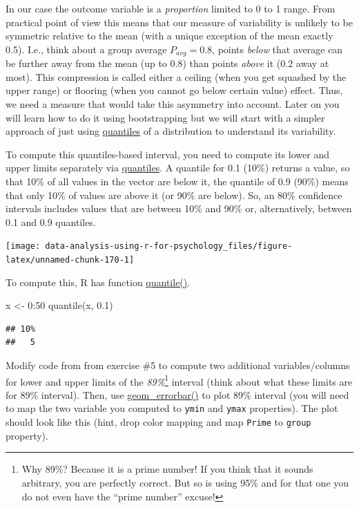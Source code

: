 \documentclass[
]{book}
\newenvironment{Shaded}{\begin{snugshade}}{\end{snugshade}}
\newcommand{\DecValTok}[1]{\textcolor[rgb]{0.00,0.00,0.81}{#1}}
\newcommand{\FloatTok}[1]{\textcolor[rgb]{0.00,0.00,0.81}{#1}}
\newcommand{\FunctionTok}[1]{\textcolor[rgb]{0.00,0.00,0.00}{#1}}
\newcommand{\NormalTok}[1]{#1}
\newcommand{\OtherTok}[1]{\textcolor[rgb]{0.56,0.35,0.01}{#1}}
\newcommand{\SpecialCharTok}[1]{\textcolor[rgb]{0.00,0.00,0.00}{#1}}
\begin{document}
In our case the outcome variable is a \emph{proportion} limited to 0 to 1 range. From practical point of view this means that our measure of variability is unlikely to be symmetric relative to the mean (with a unique exception of the mean exactly 0.5). I.e., think about a group average \(P_{avg} = 0.8\), points \emph{below} that average can be further away from the mean (up to 0.8) than points \emph{above} it (0.2 away at most). This compression is called either a ceiling (when you get squashed by the upper range) or flooring (when you cannot go below certain value) effect. Thus, we need a measure that would take this asymmetry into account. Later on you will learn how to do it using bootstrapping but we will start with a simpler approach of just using \href{https://en.wikipedia.org/wiki/Quantile}{quantiles} of a distribution to understand its variability.

To compute this quantiles-based interval, you need to compute its lower and upper limits separately via \href{https://en.wikipedia.org/wiki/Quantile}{quantiles}. A quantile for 0.1 (10\%) returns a value, so that 10\% of all values in the vector are below it, the quantile of 0.9 (90\%) means that only 10\% of values are above it (or 90\% are below). So, an 80\% confidence intervals includes values that are between 10\% and 90\% or, alternatively, between 0.1 and 0.9 quantiles.

\begin{center}\texttt{[image: data-analysis-using-r-for-psychology\_files/figure-latex/unnamed-chunk-170-1]} \end{center}

To compute this, R has function \href{https://stat.ethz.ch/R-manual/R-devel/library/stats/html/quantile.html}{quantile()}.

\begin{Shaded}
\begin{Highlighting}[]
\NormalTok{x }\OtherTok{\textless{}{-}} \DecValTok{0}\SpecialCharTok{:}\DecValTok{50}
\FunctionTok{quantile}\NormalTok{(x, }\FloatTok{0.1}\NormalTok{)}
\end{Highlighting}
\end{Shaded}

\begin{verbatim}
## 10% 
##   5
\end{verbatim}

Modify code from from exercise \#5 to compute two additional variables/columns for lower and upper limits of the \emph{89\%}\footnote{Why 89\%? Because it is a prime number! If you think that it sounds arbitrary, you are perfectly correct. But so is using 95\% and for that one you do not even have the ``prime number'' excuse!} interval (think about what these limits are for 89\% interval). Then, use \href{https://ggplot2.tidyverse.org/reference/geom_linerange.html}{geom\_errorbar()} to plot 89\% interval (you will need to map the two variable you computed to \texttt{ymin} and \texttt{ymax} properties). The plot should look like this (hint, drop color mapping and map \texttt{Prime} to \texttt{group} property).
\end{document}
